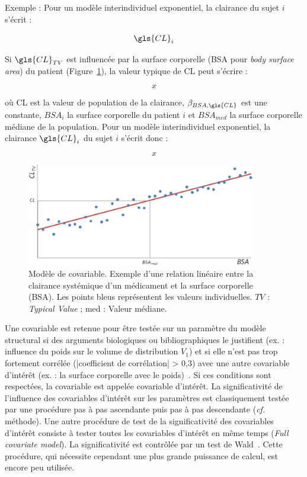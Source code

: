 Exemple : Pour un modèle interindividuel exponentiel, la clairance du sujet $i$ s'écrit :

\begin{equation}
\gls{CL}_i
\label{eq:46}
\end{equation}

Si $\gls{CL}_{TV}$ est influencée par la surface corporelle (BSA pour \textit{body surface area}) du patient (Figure~\ref{fig:9}), la valeur typique de \gls{CL} peut s'écrire :

\begin{equation}
x
\label{eq:47}
\end{equation}

où \gls{CL} est la valeur de population de la clairance, $\beta_{BSA,\gls{CL}}$ est une constante, $BSA_i$ la surface corporelle du patient $i$ et $BSA_{med}$ la surface corporelle médiane de la population. Pour un modèle interindividuel exponentiel, la clairance $\gls{CL}_i$ du sujet $i$ s'écrit donc :

\begin{equation}
x
\label{eq:48}
\end{equation}

\begin{figure}[htbp]
	\centering
		\includegraphics[width=10cm]{figures/raster/FIG_9}
	\caption[Modèle de covariable.]{Modèle de covariable. Exemple d'une relation linéaire entre la clairance systémique d'un médicament et la surface corporelle (BSA). Les points bleus représentent les valeurs individuelles. $TV$ : \textit{Typical Value} ; med : Valeur médiane.}
	\label{fig:9}
\end{figure}

Une covariable est retenue pour être testée sur un paramètre du modèle structural si des arguments biologiques ou bibliographiques le justifient (ex. : influence du poids sur le volume de distribution $V_1$) et si elle n'est pas trop fortement corrélée (|coefficient de corrélation| > 0,3) avec une autre covariable d'intérêt (ex. : la surface corporelle avec le poids)~\citep{REF11}. Si ces conditions sont respectées, la covariable est appelée covariable d'intérêt. La significativité de l'influence des covariables d'intérêt sur les paramètres est classiquement testée par une procédure pas à pas ascendante puis pas à pas descendante (\textit{cf.} méthode). Une autre procédure de test de la significativité des covariables d'intérêt consiste à tester toutes les covariables d'intérêt en même temps (\textit{Full covariate model}). La significativité est contrôlée par un test de Wald~\citep{REF12}. Cette procédure, qui nécessite cependant une plus grande puissance de calcul, est encore peu utilisée.

